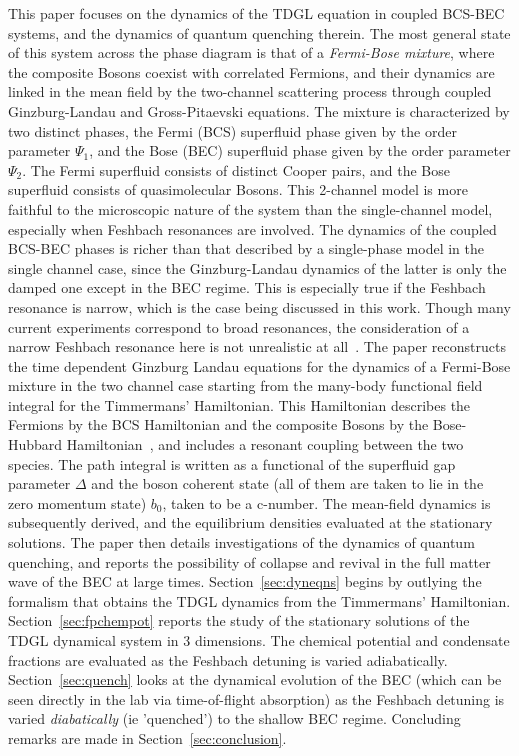 \documentclass[a4paper,10pt]{article}
\begin{document}
This paper focuses on the dynamics of the TDGL equation in coupled BCS-BEC systems, and the dynamics of quantum quenching therein. The most general state of this system across the phase diagram is that of a \textit{Fermi-Bose mixture}, where the composite Bosons coexist with correlated Fermions, and their dynamics are linked in the mean field by the two-channel scattering process through coupled Ginzburg-Landau and Gross-Pitaevski equations. The mixture is characterized by two distinct phases, the Fermi (BCS) superfluid phase given by the order parameter $\Psi_1$, and the Bose (BEC) superfluid phase given by the order parameter $\Psi_2$. The Fermi superfluid consists of distinct Cooper pairs, and the Bose superfluid consists of quasimolecular Bosons. This 2-channel model is more faithful to the microscopic nature of the system than the single-channel model, especially when Feshbach resonances are involved. The dynamics of the coupled BCS-BEC phases is richer than that described by a single-phase model in the single channel case, since the Ginzburg-Landau dynamics of the latter is only the damped one except in the BEC regime. This is especially true if the Feshbach resonance is narrow, which is the case being discussed in this work.  {Though many current experiments correspond to broad resonances, the consideration of a narrow Feshbach resonance here is not unrealistic at all}~\cite{rembert:stoof,stoof:other}. The paper reconstructs the time dependent Ginzburg Landau equations for the dynamics of a Fermi-Bose mixture in the two channel case starting from the many-body functional field integral for the Timmermans' Hamiltonian. This Hamiltonian describes the Fermions by the BCS Hamiltonian and the composite Bosons by the Bose-Hubbard Hamiltonian~\cite{timmermans}, and includes a resonant coupling between the two species. The path integral is written as a functional of the superfluid gap parameter $\Delta$ and the boson coherent state (all of them are taken to lie in the zero momentum state) $b_0$, taken to be a c-number. The mean-field dynamics is subsequently derived, and the equilibrium densities evaluated at the stationary solutions. The paper then details investigations of the dynamics of quantum quenching, and reports the possibility of collapse and revival in the full matter wave of the BEC at large times.  Section~\ref{sec:dyneqns} begins by outlying the formalism that obtains the TDGL dynamics from the Timmermans' Hamiltonian. Section~\ref{sec:fpchempot} reports the study of the stationary solutions of the TDGL dynamical system in 3 dimensions. The chemical potential and condensate fractions are evaluated as the Feshbach detuning is varied adiabatically. Section~\ref{sec:quench} looks at the dynamical evolution of the BEC (which can be seen directly in the lab via time-of-flight absorption) as the Feshbach detuning is varied \textit{diabatically} (ie 'quenched') to the shallow BEC regime. Concluding remarks are made in Section~\ref{sec:conclusion}.
%
\end{document}
